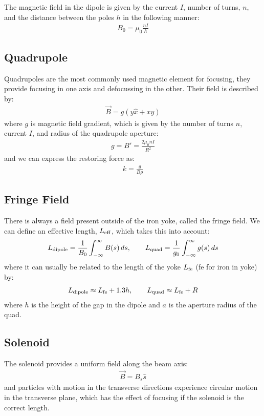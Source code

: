 \documentclass{article}
\numberwithin{equation}{section}
\begin{document}
The magnetic field in the dipole is given by the current $I$, number of turns, $n$, and the distance between the poles $h$ in the following manner:
\begin{align}
B_0 = \mu_0 \frac{nI}{h}
\end{align}

\subsection{Quadrupole}

Quadrupoles are the most commonly used magnetic element for focusing, they provide focusing in one axis and defocussing in the other. Their field is described by:
\begin{align}
\vec{B} = g (y \hat{x} + x \hat{y})
\end{align}
where $g$ is magnetic field gradient, which is given by the number of turns $n$, current $I$, and radius of the quadrupole aperture:
\begin{align}
g = B' = \frac{2 \mu_0 n I}{R^2}
\end{align}
and we can express the restoring force as:
\begin{align}
k = \frac{g}{B\rho}
\end{align}

\subsection{Fringe Field}

There is always a field present outside of the iron yoke, called the fringe field. We can define an effective length, $L_{\rm eff}$, which takes this into account:
\begin{align}
L_{\rm dipole} = \frac{1}{B_0} \int_{-\infty}^{\infty} B(s) \, ds ,\qquad
L_{\rm quad} = \frac{1}{g_0} \int_{-\infty}^{\infty} g(s) \, ds
\end{align}
where it can usually be related to the length of the yoke $L_{\rm fe}$ (fe for iron in yoke) by:
\begin{align}
L_{\rm dipole} \approx L_{\rm fe} + 1.3 h ,\qquad
L_{\rm quad} \approx L_{\rm fe} + R
\end{align}
where $h$ is the height of the gap in the dipole and $a$ is the aperture radius of the quad.

\subsection{Solenoid}
The solenoid provides a uniform field along the beam axis:
\begin{align}
\vec{B} = B_s \hat{s}
\end{align}
and particles with motion in the transverse directions experience circular motion in the transverse plane, which has the effect of focusing if the solenoid is the correct length.
\end{document}
